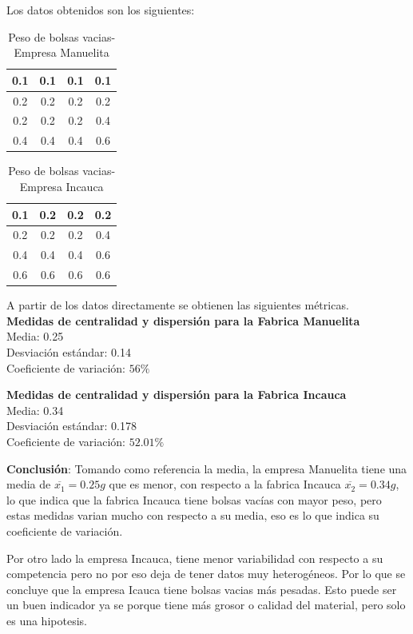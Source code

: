 \documentclass[12pt]{article}
\begin{document}
	Los datos obtenidos son los siguientes:\\ 
	
	\begin{table}[h!]
		\centering
		\begin{tabular}{|c|c|c|c|} 
			\hline
			0.1 & 0.1 & 0.1 & 0.1 \\ 
			\hline
			0.2 & 0.2 & 0.2 & 0.2 \\ 
			\hline
			0.2 & 0.2 & 0.2 & 0.4 \\ 
			\hline
			0.4 & 0.4 & 0.4 & 0.6 \\ 
			\hline
		\end{tabular}
		\caption{Peso de bolsas vacias-Empresa Manuelita}
	\end{table} \newpage
	
	\begin{table}[h!]
		\centering
		\begin{tabular}{|c|c|c|c|} 
			\hline
			0.1 & 0.2 & 0.2 & 0.2 \\ 
			\hline
			0.2 & 0.2 & 0.2 & 0.4 \\ 
			\hline
			0.4 & 0.4 & 0.4 & 0.6 \\ 
			\hline
			0.6 & 0.6 & 0.6 & 0.6 \\ 
			\hline
		\end{tabular}
		\caption{Peso de bolsas vacias-Empresa Incauca}
	\end{table}
	
	A partir de los datos directamente se obtienen las siguientes métricas. \\
	
	\textbf{{\large Medidas de centralidad y dispersión para la Fabrica Manuelita}}\\
	{\large Media:} 0.25 \\
	{\large Desviación estándar:} 0.14 \\
	{\large Coeficiente de variación}: $56\%$ \\
	\vspace{0.2cm}
	
	\textbf{{\large Medidas de centralidad y dispersión para la Fabrica Incauca}}\\
	{\large Media:} 0.34 \\
	{\large Desviación estándar:} 0.178 \\
	{\large Coeficiente de variación}: $52.01\%$ \\
	\vspace{0.2cm}
	
	{\large \textbf{Conclusión}}: 
	Tomando como referencia la media, la empresa Manuelita tiene una media de $\overline{x_1}=0.25g$ que es menor, con respecto a la fabrica Incauca $\overline{x_2}=0.34g$, lo que indica que la fabrica Incauca tiene bolsas vacías con mayor peso, pero estas medidas varian mucho con respecto a su media, eso es lo que indica su coeficiente de variación. 
	
	Por otro lado la empresa Incauca, tiene menor variabilidad con respecto a su competencia pero no por eso deja de tener datos muy heterogéneos. 
	Por lo que se concluye que la empresa Icauca tiene bolsas vacias más pesadas. Esto puede ser un buen indicador ya se porque tiene más grosor o calidad del material, pero solo es una hipotesis. 
	
\end{document}
